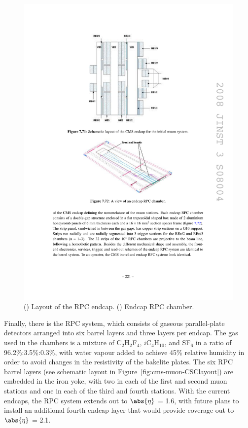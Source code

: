 \begin{figure}[hbtp]
\begin{center}
    \includegraphics[width=\cmsFigWidth]{figures/cms-muon-RPCendcapchamber}
    \caption{(\cmsLeft) Layout of the RPC endcap. (\cmsRight) Endcap RPC chamber.~\cite{1748-0221-3-08-S08004}}
    \label{fig:cms-muon-RPCendcap}
  \end{center}
\end{figure}

Finally, there is the RPC system, which consists of gaseous parallel-plate detectors arranged into six barrel layers and three layers per endcap. The gas used in the chambers is a mixture of C$_2$H$_2$F$_4$, $i$C$_4$H$_{10}$, and SF$_6$ in a ratio of 96.2\%:3.5\%:0.3\%, with water vapour added to achieve 45\% relative humidity in order to avoid changes in the resistivity of the bakelite plates. The six RPC barrel layers (see schematic layout in Figure~\ref{fig:cms-muon-CSClayout}) are embedded in the iron yoke, with two in each of the first and second muon stations and one in each of the third and fourth stations. With the current endcaps, the RPC system extends out to $\abs{\eta}$ = 1.6, with future plans to install an additional fourth endcap layer that would provide coverage out to $\abs{\eta}$ = 2.1.


